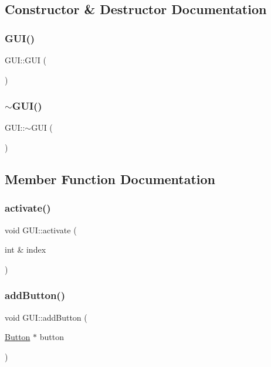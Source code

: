 \subsection{Constructor \& Destructor Documentation}
\mbox{\label{class_g_u_i_a8cbb3140b7d3c9d8e942d6ce6b60a0e8}} 
\subsubsection{\texorpdfstring{GUI()}{GUI()}}
{\footnotesize\ttfamily G\+U\+I\+::\+G\+UI (\begin{DoxyParamCaption}{ }\end{DoxyParamCaption})}

\mbox{\label{class_g_u_i_ac9cae2328dcb5d83bdfaeca49a2eb695}} 
\subsubsection{\texorpdfstring{$\sim$GUI()}{~GUI()}}
{\footnotesize\ttfamily G\+U\+I\+::$\sim$\+G\+UI (\begin{DoxyParamCaption}{ }\end{DoxyParamCaption})}



\subsection{Member Function Documentation}
\mbox{\label{class_g_u_i_a6110a841f353acfc14a23238a7260df6}} 
\subsubsection{\texorpdfstring{activate()}{activate()}}
{\footnotesize\ttfamily void G\+U\+I\+::activate (\begin{DoxyParamCaption}\item[{int \&}]{index }\end{DoxyParamCaption})}

\mbox{\label{class_g_u_i_a2d2a03583ec32ec72c29f77a85e38a60}} 
\subsubsection{\texorpdfstring{addButton()}{addButton()}}
{\footnotesize\ttfamily void G\+U\+I\+::add\+Button (\begin{DoxyParamCaption}\item[{\mbox{\hyperlink{class_button}{Button}} $\ast$}]{button }\end{DoxyParamCaption})}

